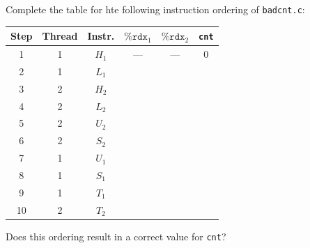 \documentclass[12pt]{article}
\newenvironment{ex}[2][Exercise]{\begin{trivlist}
		\item[\hskip \labelsep {\bfseries #1}\hskip \labelsep {\bfseries #2.}]}{\end{trivlist}}
\begin{document}
\begin{ex}{12.7}
	Complete the table for hte following instruction ordering of \texttt{badcnt.c}:
	\begin{center}
		\begin{tabular}{cccccc}
			Step & Thread & Instr. & $\texttt{\%rdx}_1$ & $\texttt{\%rdx}_2$ & \texttt{cnt}\\
			\hline
			1 & 1 & $H_1$ & --- & --- & $0$\\
			2 & 1 & $L_1$ & \makebox[1cm]{\hrulefill} & \makebox[1cm]{\hrulefill}  & \makebox[1cm]{\hrulefill} \\
			
			3 & 2 & $H_2$ & \makebox[1cm]{\hrulefill} & \makebox[1cm]{\hrulefill}  & \makebox[1cm]{\hrulefill} \\
			
			4 & 2 & $L_2$ & \makebox[1cm]{\hrulefill} & \makebox[1cm]{\hrulefill}  & \makebox[1cm]{\hrulefill} \\
			
			5 & 2 & $U_2$ & \makebox[1cm]{\hrulefill} & \makebox[1cm]{\hrulefill}  & \makebox[1cm]{\hrulefill} \\
			
			6 & 2 & $S_2$ & \makebox[1cm]{\hrulefill} & \makebox[1cm]{\hrulefill}  & \makebox[1cm]{\hrulefill} \\
			
			7 & 1 & $U_1$ & \makebox[1cm]{\hrulefill} & \makebox[1cm]{\hrulefill}  & \makebox[1cm]{\hrulefill} \\
			
			8 & 1 & $S_1$ & \makebox[1cm]{\hrulefill} & \makebox[1cm]{\hrulefill}  & \makebox[1cm]{\hrulefill} \\
			
			9 & 1 & $T_1$ & \makebox[1cm]{\hrulefill} & \makebox[1cm]{\hrulefill}  & \makebox[1cm]{\hrulefill} \\
			
			10 & 2 & $T_2$ & \makebox[1cm]{\hrulefill} & \makebox[1cm]{\hrulefill}  & \makebox[1cm]{\hrulefill} \\
		\end{tabular}
	\end{center}
	Does this ordering result in a correct value for \texttt{cnt}?
\end{ex}
\end{document}
